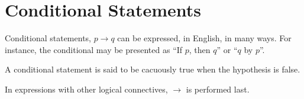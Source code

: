 \guard

\section{Conditional Statements}



Conditional statements, $p\rightarrow q$ can be expressed, in English, in many ways.
For instance, the conditional may be presented as ``If $p$, then $q$'' or ``$q$ by $p$''.

A conditional statement is said to be cacuously true when the hypothesis is false.

In expressions with other logical connectives, $\rightarrow$ is performed last.

















